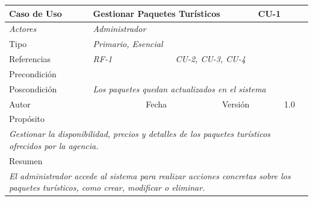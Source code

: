 
\begin{table}[H]
\begin{tabular}{|llllllll|}
\hline
\multicolumn{1}{|l|}{\cellcolor[HTML]{F2F2F2}Caso de Uso} & \multicolumn{5}{l|}{Gestionar Paquetes Turísticos} & \multicolumn{2}{l|}{\cellcolor[HTML]{E6E6E6}CU-1} \\ \hline
\multicolumn{1}{|l|}{{\color[HTML]{808080} \textit{Actores}}} & \multicolumn{7}{l|}{{\color[HTML]{808080} \textit{Administrador}}} \\ \hline
\multicolumn{1}{|l|}{Tipo} & \multicolumn{7}{l|}{{\color[HTML]{808080} \textit{Primario, Esencial}}} \\ \hline
\multicolumn{1}{|l|}{Referencias} & \multicolumn{2}{l|}{{\color[HTML]{808080} \textit{RF-1}}} & \multicolumn{5}{l|}{{\color[HTML]{808080} \textit{CU-2, CU-3, CU-4}}} \\ \hline
\multicolumn{1}{|l|}{Precondición} & \multicolumn{7}{l|}{} \\ \hline
\multicolumn{1}{|l|}{Poscondición} & \multicolumn{7}{l|}{{\color[HTML]{808080} \textit{Los paquetes quedan actualizados en el sistema}}} \\ \hline
\multicolumn{1}{|l|}{Autor} & \multicolumn{1}{l|}{} & \multicolumn{2}{l|}{Fecha} & \multicolumn{1}{l|}{} & \multicolumn{2}{l|}{Versión} & 1.0 \\ \hline
\multicolumn{8}{|l|}{Propósito} \\ \hline
\multicolumn{8}{|p{15cm}|}{{\color[HTML]{808080} \textit{Gestionar la disponibilidad, precios y detalles de los paquetes turísticos ofrecidos por la agencia.}}} \\ \hline
\multicolumn{8}{|l|}{Resumen} \\ \hline
\multicolumn{8}{|p{15cm}|}{{\color[HTML]{808080} \textit{El administrador accede al sistema para realizar acciones concretas sobre los paquetes turísticos, como crear, modificar o eliminar.}}} \\ \hline
\end{tabular}
\end{table}

